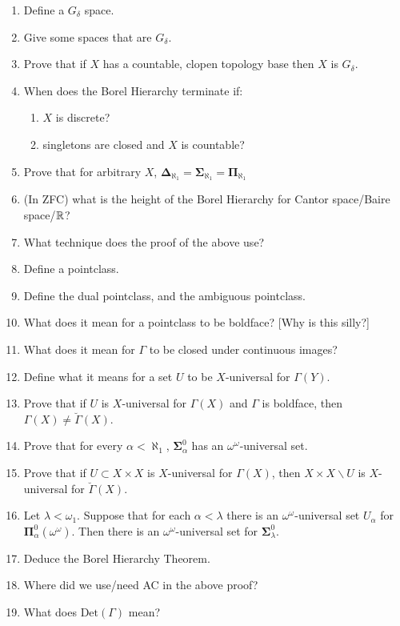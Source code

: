 \documentclass[]{article}
\newcommand{\om}{\omega}
\newcommand{\bosig}{\bm{\Sigma}}
\newcommand{\bopi}{\bm{\Pi}}
\newcommand{\bodel}{\bm{\Delta}}
\newcommand{\bg}{{\breve \Gamma}}
\newcommand{\Det}{\textrm{Det}}
\begin{document}
\begin{enumerate}
    \item Define a $G_\delta$ space.
    \item Give some spaces that are $G_\delta$.
    \item Prove that if $X$ has a countable, clopen topology base then $X$ is $G_\delta$.
    \item When does the Borel Hierarchy terminate if:
    \begin{enumerate}
        \item $X$ is discrete?
        \item singletons are closed and $X$ is countable?
    \end{enumerate}
    \item Prove that for arbitrary $X$, $\bodel_{\aleph_1} = \bosig_{\aleph_1} = \bopi_{\aleph_1}$
    \item (In ZFC) what is the height of the Borel Hierarchy for Cantor space/Baire space/$\mathbb{R}$?
    \item What technique does the proof of the above use?
    \item Define a pointclass.
    \item Define the dual pointclass, and the ambiguous pointclass.
    \item What does it mean for a pointclass to be boldface? [Why is this silly?]
    \item What does it mean for $\Gamma$ to be closed under continuous images?
    \item Define what it means for a set $U$ to be $X$-universal for $\Gamma(Y)$.
    \item Prove that if $U$ is $X$-universal for $\Gamma(X)$ and $\Gamma$ is boldface, then $\Gamma(X) \ne \breve{\Gamma}(X)$.
    \item Prove that for every $\alpha < \aleph_1$, $\bosig^0_\alpha$ has an $\om^\om$-universal set.
    \item Prove that if $U\subset X\times X$ is $X$-universal for $\Gamma(X)$, then $X\times X\backslash U$ is $X$-universal for $\bg(X)$.
    \item Let $\lambda < \om_1$. Suppose that for each $\alpha < \lambda$ there is an $\om^\om$-universal set $U_\alpha$ for $\bopi^0_\alpha(\om^\om)$. Then there is an $\om^\om$-universal set for $\bosig^0_\lambda$.
    \item Deduce the Borel Hierarchy Theorem.
    \item Where did we use/need AC in the above proof?
    \item What does $\Det(\Gamma)$ mean?

\end{enumerate}
\end{document}
